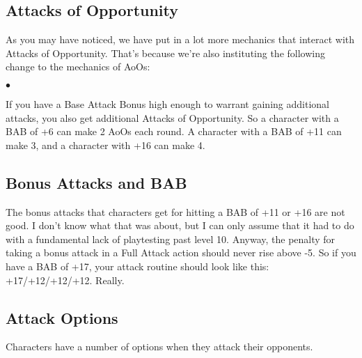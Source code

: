 \subsection{Attacks of Opportunity}

As you may have noticed, we have put in a lot more mechanics that interact with Attacks of Opportunity. That's because we're also instituting the following change to the mechanics of AoOs:

  \begin{list}{$\bullet$}{\itemspace} \item If you have a Base Attack Bonus high enough to warrant gaining additional attacks, you also get additional Attacks of Opportunity.  So a character with a BAB of +6 can make 2 AoOs each round. A character with a BAB of +11 can make 3, and a character with +16 can make 4.\end{list}


\subsection{Bonus Attacks and BAB}

The bonus attacks that characters get for hitting a BAB of +11 or +16 are not good. I don't know what that was about, but I can only assume that it had to do with a fundamental lack of playtesting past level 10. Anyway, the penalty for taking a bonus attack in a Full Attack action should never rise above -5. So if you have a BAB of +17, your attack routine should look like this: +17/+12/+12/+12. Really.

\subsection{Attack Options}

Characters have a number of options when they attack their opponents.

